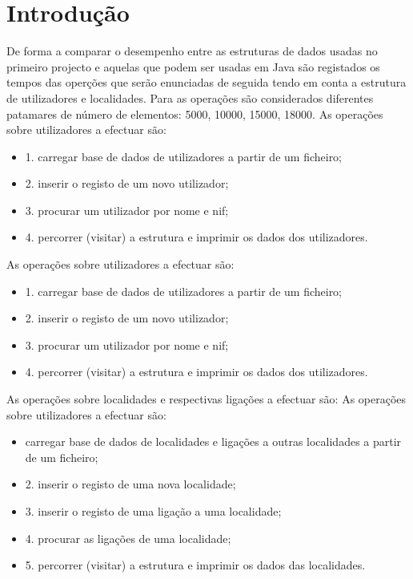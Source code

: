 \documentclass[a5paper,twocolumn, 11pt]{article}
\begin{document}
\clearpage
\section{Introdução}
De forma a comparar o desempenho entre as estruturas de dados usadas no primeiro projecto e aquelas que podem ser usadas em Java são registados os tempos das operções que serão enunciadas de seguida tendo em conta a  estrutura de utilizadores e localidades. Para as operações são considerados diferentes patamares de número de elementos: 5000, 10000, 15000, 18000. 
As operações sobre utilizadores a efectuar são:
\begin{itemize}
    \item{1. carregar base de dados de utilizadores a partir de um ficheiro;}
    \item{2. inserir o registo de um novo utilizador;}
    \item{3. procurar um utilizador por nome e nif;}
    \item{4. percorrer (visitar) a estrutura e imprimir os dados dos utilizadores.}
\end{itemize}
As operações sobre utilizadores a efectuar são:
\begin{itemize}
    \item{1. carregar base de dados de utilizadores a partir de um ficheiro;}
    \item{2. inserir o registo de um novo utilizador;}
    \item{3. procurar um utilizador por nome e nif;}
    \item{4. percorrer (visitar) a estrutura e imprimir os dados dos utilizadores.}
\end{itemize}
As operações sobre localidades e respectivas ligações a efectuar são:
As operações sobre utilizadores a efectuar são:
\begin{itemize}
    \item{ carregar base de dados de localidades e ligações a outras localidades a
partir de um ficheiro;}
    \item{2. inserir o registo de uma nova localidade;}
    \item{3. inserir o registo de uma ligação a uma localidade;}
    \item{4. procurar as ligações de uma localidade;}
    \item{5. percorrer (visitar) a estrutura e imprimir os dados das localidades.}
\end{itemize}
\end{document}
